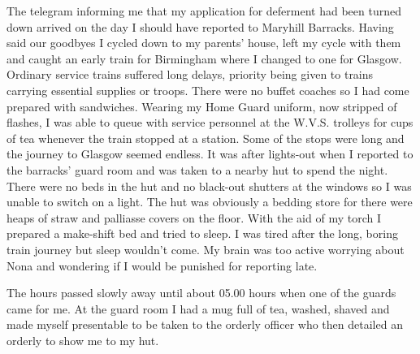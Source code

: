 The telegram informing me that my application for deferment had been
turned down arrived on the day I should have reported to Maryhill
Barracks. Having said our goodbyes I cycled down to my parents'
house, left my cycle with them and caught an early train for
Birmingham where I changed to one for Glasgow. Ordinary service trains
suffered long delays, priority being given to trains carrying
essential supplies or troops. There were no buffet coaches so I had
come prepared with sandwiches. Wearing my Home Guard uniform, now
stripped of flashes, I was able to queue with service personnel at the
W.V.S. trolleys for cups of tea whenever the train stopped at a
station. Some of the stops were long and the journey to Glasgow
seemed endless. It was after lights-out when I reported to the
barracks' guard room and was taken to a nearby hut to spend the night.
There were no beds in the hut and no black-out shutters at the windows
so I was unable to switch on a light. The hut was obviously a bedding
store for there were heaps of straw and palliasse covers on the floor.
With the aid of my torch I prepared a make-shift bed and tried to
sleep. I was tired after the long, boring train journey but sleep
wouldn't come. My brain was too active worrying about Nona and
wondering if I would be punished for reporting late.

The hours passed slowly away until about 05.00 hours when one of the
guards came for me. At the guard room I had a mug full of tea,
washed, shaved and made myself presentable to be taken to the orderly
officer who then detailed an orderly to show me to my hut.
